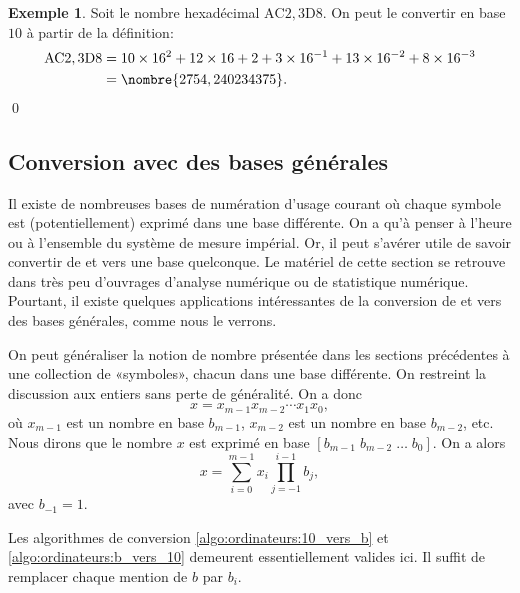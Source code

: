 \documentclass[letterpaper,11pt]{memoir}
\theoremstyle{plain}
\theoremstyle{definition}
\newtheorem{exemple}{Exemple}[chapter]
\theoremstyle{remark}
\begin{document}
\begin{exemple}
  Soit le nombre hexadécimal $\mathrm{AC}2,3\mathrm{D}8$. On peut le
  convertir en base $10$ à partir de la définition:
  \begin{align*}
    \mathrm{AC}2,3\mathrm{D}8
    &= 10 \times 16^2 + 12 \times 16 + 2 + 3 \times 16^{-1} + 13
    \times 16^{-2} + 8 \times 16^{-3} \\
    &= \nombre{2754,240234375}.
  \end{align*}
  \qed
\end{exemple}


\subsection{Conversion avec des bases générales}
\label{sec:ordinateurs:conversion:bases_generales}

Il existe de nombreuses bases de numération d'usage courant où chaque
symbole est (potentiellement) exprimé dans une base différente. On a
qu'à penser à l'heure ou à l'ensemble du système de mesure impérial.
Or, il peut s'avérer utile de savoir convertir de et vers une base
quelconque. Le matériel de cette section se retrouve dans très peu
d'ouvrages d'analyse numérique ou de statistique numérique. Pourtant,
il existe quelques applications intéressantes de la conversion de et
vers des bases générales, comme nous le verrons.

On peut généraliser la notion de nombre présentée dans les sections
précédentes à une collection de «symboles», chacun dans une base
différente. On restreint la discussion aux entiers sans perte de
généralité. On a donc
\begin{displaymath}
  x = x_{m-1}x_{m-2} \cdots x_1x_0,
\end{displaymath}
où $x_{m - 1}$ est un nombre en base $b_{m - 1}$, $x_{m - 2}$ est un
nombre en base $b_{m - 2}$, etc. Nous dirons que le nombre $x$ est
exprimé en base $[b_{m - 1}\; b_{m - 2}\; \dots\; b_0]$. On a alors
\begin{equation}
  \label{eq:ordinateurs:def_base_gen}
  x = \sum_{i = 0}^{m - 1} x_i \prod_{j = -1}^{i - 1} b_j,
\end{equation}
avec $b_{-1} = 1$.

Les algorithmes de conversion \ref{algo:ordinateurs:10_vers_b} et
\ref{algo:ordinateurs:b_vers_10} demeurent essentiellement valides
ici. Il suffit de remplacer chaque mention de $b$ par $b_i$.
\end{document}

